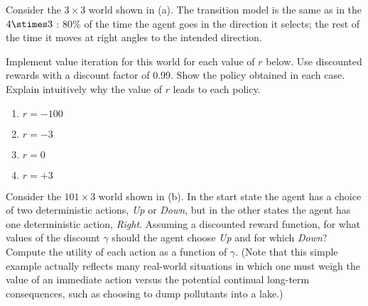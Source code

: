 \begin{exercise}
Consider the \(3 \times 3\) world shown in (a).
The transition model is the same as in the \(4\stimes 3\)
: 80\% of the time the agent
goes in the direction it selects; the rest of the time it moves at
right angles to the intended direction. 

Implement value iteration for this world for each value of
\(r\) below.  Use discounted rewards with a discount factor of 0.99.  Show
the policy obtained in each case.  Explain intuitively why the value
of \(r\) leads to each policy.
\begin{enumerate}
\item \(r = -100\)
\item \(r = -3\)
\item \(r = 0\)
\item \(r = +3\)
\end{enumerate}
\end{exercise} 

\begin{exercise}
Consider the \(101 \times 3\) world shown in (b).
In the start state the agent has a choice of
two deterministic actions, {\em Up} or {\em Down}, but in the other
states the agent has one deterministic action, {\em Right}.  Assuming a discounted
reward function, for what values of the discount \(\gamma\) should the
agent choose {\em Up} and for which {\em Down}? Compute the utility of
each action as a function of \(\gamma\). (Note that this simple
example actually reflects many real-world situations in which one must
weigh the value of an immediate action versus the potential continual
long-term consequences, such as choosing to dump pollutants into a
lake.)
\end{exercise} 



